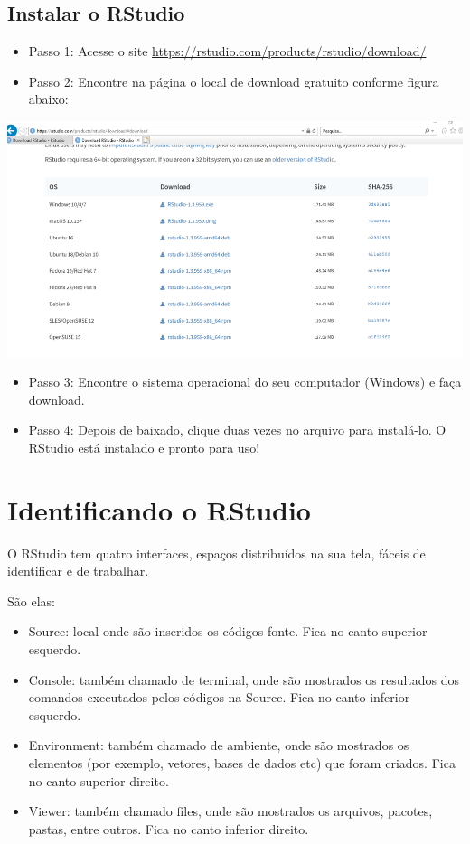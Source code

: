 \documentclass[
  10pt,
  brazil,
  a4paper,
  twoside, notitlepage, openright]{book}
\providecommand{\tightlist}{%
  \setlength{\itemsep}{0pt}\setlength{\parskip}{0pt}}
\begin{document}
\hypertarget{instalar-o-rstudio-2}{%
\subsection{Instalar o RStudio}\label{instalar-o-rstudio-2}}

\begin{itemize}
\tightlist
\item
  Passo 1: Acesse o site \url{https://rstudio.com/products/rstudio/download/}\\
\item
  Passo 2: Encontre na página o local de download gratuito conforme figura abaixo:
\end{itemize}

\includegraphics[width=13.54in]{img/inst_1_rstudio}

\begin{itemize}
\tightlist
\item
  Passo 3: Encontre o sistema operacional do seu computador (Windows) e faça download.
\item
  Passo 4: Depois de baixado, clique duas vezes no arquivo para instalá-lo. O RStudio está instalado e pronto para uso!
\end{itemize}

\hypertarget{identificando-o-rstudio}{%
\section{Identificando o RStudio}\label{identificando-o-rstudio}}

O RStudio tem quatro interfaces, espaços distribuídos na sua tela, fáceis de identificar e de trabalhar.

São elas:

\begin{itemize}
\tightlist
\item
  Source: local onde são inseridos os códigos-fonte. Fica no canto superior esquerdo.
\item
  Console: também chamado de terminal, onde são mostrados os resultados dos comandos executados pelos códigos na Source. Fica no canto inferior esquerdo.
\item
  Environment: também chamado de ambiente, onde são mostrados os elementos (por exemplo, vetores, bases de dados etc) que foram criados. Fica no canto superior direito.
\item
  Viewer: também chamado files, onde são mostrados os arquivos, pacotes, pastas, entre outros. Fica no canto inferior direito.
\end{itemize}
\end{document}
